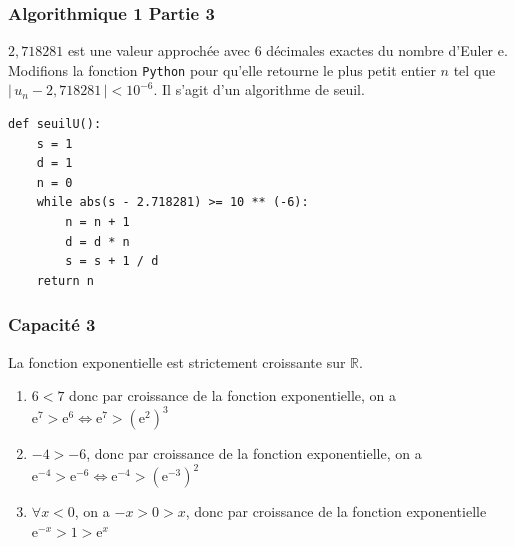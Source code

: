 \documentclass[11pt, hyperref={urlcolor=red,%
            linkcolor=blue, %
            colorlinks=true}]{beamer}
\newcommand{\R}{\mathbb{R}}
\newcommand{\e}{\text{e}}
\newcommand{\valabs}[1]{\big| \, #1 \, \big|}
\begin{document}
\begin{frame}[fragile]
\frametitle{Algorithmique 1 Partie 3}
$2,718281$ est une valeur approchée avec 6 décimales exactes du nombre d'Euler  $\text{e}$. Modifions la fonction \texttt{Python} pour qu'elle retourne le plus petit entier $n$ tel que $\valabs{u_{n}-2,718281} < 10^{-6}$.
Il s'agit d'un algorithme de seuil.
	

\begin{center}
\begin{lstlisting}[style=rond]
def seuilU():
	s = 1
	d = 1
	n = 0
	while abs(s - 2.718281) >= 10 ** (-6):
		n = n + 1 
		d = d * n
		s = s + 1 / d
	return n		
\end{lstlisting}
\end{center}

\end{frame}


\begin{frame}
\frametitle{Capacité 3}
\label{capacite3}

La fonction exponentielle est strictement croissante sur $\R$. 


\begin{enumerate}
	\item $6<7$ donc par croissance de la fonction exponentielle, on a $\e^{7} > \e^{6} \Longleftrightarrow \e^{7} > \left(\e^{2}\right)^{3}$
	\item  $-4>-6$, donc par croissance de la fonction exponentielle, on a $\e^{-4} > \e^{-6} \Longleftrightarrow  \e^{-4} > \left(\e^{-3}\right)^{2}$
	\item $\forall x<0$, on a $-x>0>x$, donc par croissance de la fonction exponentielle $\e^{-x} > 1 > \e^{x}$
\end{enumerate}




\end{frame}
\end{document}
